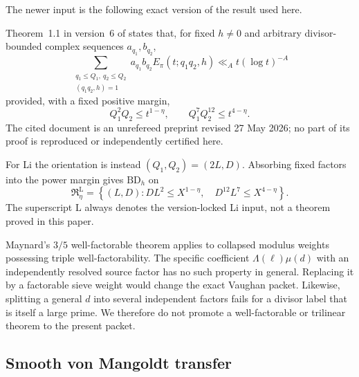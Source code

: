 The newer input is the following exact version of the result used here.

\begin{assumption}
\label{input:li-v6}
Theorem~1.1 in version~6 of \citet{Li2026v6} states that, for fixed
$h\ne0$ and arbitrary
divisor-bounded complex sequences $a_{q_1},b_{q_2}$,
\begin{equation}
 \sum_{\substack{q_1\le Q_1,\ q_2\le Q_2\\(q_1q_2,h)=1}}
 a_{q_1}b_{q_2}E_\pi(t;q_1q_2,h)
 \ll_A t(\log t)^{-A}
 \label{eq:li-v6-theorem}
\end{equation}
provided, with a fixed positive margin,
\begin{equation}
 Q_1^2Q_2\le t^{1-\eta},
 \qquad
 Q_1^7Q_2^{12}\le t^{4-\eta}.
 \label{eq:li-v6-conditions}
\end{equation}
The cited document is an unrefereed preprint revised 27 May 2026; no
part of its proof is reproduced or independently certified here.
\end{assumption}

For Li the orientation is instead $(Q_1,Q_2)=(2L,D)$.  Absorbing fixed
factors into the power margin gives $\mathrm{BD}_h$ on
\begin{equation}
 \mathfrak R^{\mathrm L}_\eta
 =\left\{(L,D):
 DL^2\le X^{1-\eta},\quad
 D^{12}L^7\le X^{4-\eta}
 \right\}.
 \label{eq:li-profile}
\end{equation}
The superscript $\mathrm L$ always denotes the version-locked Li input,
not a theorem proved in this paper.

\begin{remark}
Maynard's $3/5$ well-factorable theorem \citep{Maynard2025II} applies to
collapsed modulus weights possessing triple well-factorability.  The
specific coefficient $\Lambda(\ell)\mu(d)$ with an independently
resolved source factor has no such property in general.  Replacing it
by a factorable sieve weight would change the exact Vaughan packet.
Likewise, splitting a general $d$ into several independent factors
fails for a divisor label that is itself a large prime.  We therefore do
not promote a well-factorable or trilinear theorem to the present packet.
\end{remark}

\subsection{Smooth von Mangoldt transfer}

